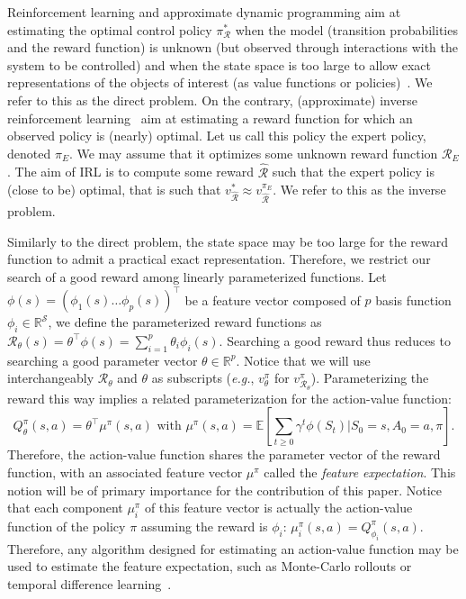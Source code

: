 \documentclass[english,utf8]{./hermes-journal}
\newcommand{\R}{\mathcal{R}}
\newcommand{\s}{\mathcal{S}}
\newcommand{\E}{\mathbb{E}}
\begin{document}
Reinforcement learning and approximate dynamic programming aim at
estimating the optimal control policy $\pi^*_\R$ when the model
(transition probabilities and the reward function) is unknown (but
observed through interactions with the system to be controlled) and
when the state space is too large to allow exact representations of
the objects of interest (as value functions or
policies)~\cite{Bertsekas:1996,Sutton:1998,szepesvari2010c}.
%
We refer to this as the direct problem.
%
On the contrary, (approximate) inverse reinforcement
learning~\cite{Ng:2000} aim at estimating a reward function for
which an observed policy is (nearly) optimal.
%
Let us call this policy the expert policy, denoted $\pi_E$. We may
assume that it optimizes some unknown reward function $\R_E$. The
aim of IRL is to compute some reward $\hat{\R}$ such that the expert
policy is (close to be) optimal, that is such that $v^*_{\hat{\R}}
\approx v^{\pi_E}_{\hat{\R}}$.
%
We refer to this as the inverse problem.

Similarly to the direct problem, the state space may be too large
for the reward function to admit a practical exact representation.
Therefore, we restrict our search of a good reward among linearly
parameterized functions. Let $\phi(s) = (\phi_1(s)  \dots
\phi_p(s))^\top$
be a feature vector composed of $p$ basis function
$\phi_i\in\mathbb{R}^\s$, we define the  parameterized reward
functions as $\R_\theta(s) = \theta^\top \phi(s) = \sum_{i=1}^p
\theta_i \phi_i(s)$.
Searching a good reward thus reduces to searching a good parameter
vector $\theta \in\mathbb{R}^p$. Notice that we will use
interchangeably $\R_\theta$ and $\theta$ as subscripts
(\textit{e.g.}, $v_\theta^\pi$ for $v_{\R_\theta}^\pi$).
Parameterizing the reward this way implies a related
parameterization for the action-value function:
\begin{equation}
  Q^\pi_\theta(s,a) = \theta^\top \mu^\pi(s,a) \text{ with }
  \mu^\pi(s,a) = \E[\sum_{t\geq 0} \gamma^t
  \phi(S_t)|S_0=s,A_0=a,\pi].
  \label{eq:def:mu}
\end{equation}
Therefore, the action-value function shares the parameter vector of
the reward function, with an associated feature vector $\mu^\pi$
called the \emph{feature expectation}. This notion will be of
primary importance for the contribution of this paper. Notice that
each component $\mu_i^\pi$ of this feature vector is actually the
action-value function of the policy $\pi$ assuming the reward is
$\phi_i$: $\mu_i^\pi(s,a) = Q^\pi_{\phi_i}(s,a)$. Therefore, any
algorithm designed for estimating an action-value function may be
used to estimate the feature expectation, such as Monte-Carlo
rollouts or temporal difference learning~\cite{Klein:2011}.
\end{document}
